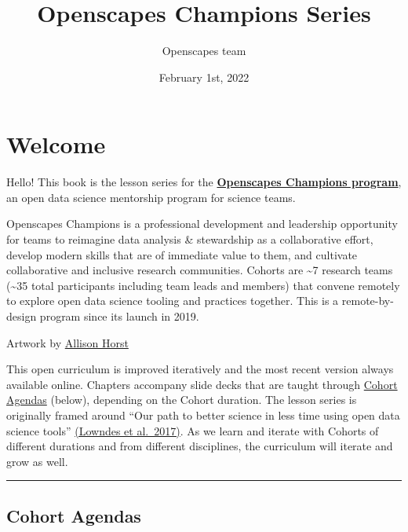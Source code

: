 \documentclass[
  letterpaper,
  DIV=11,
  numbers=noendperiod]{scrreprt}
\title{Openscapes Champions Series}
\author{Openscapes team}
\date{February 1st, 2022}
\renewcommand*\contentsname{Table of contents}
\begin{document}
\maketitle

\renewcommand*\contentsname{Table of contents}
{
\hypersetup{linkcolor=}
\setcounter{tocdepth}{2}
\tableofcontents
}
\hypertarget{welcome}{%
\chapter*{Welcome}\label{welcome}}

Hello! This book is the lesson series for the
\href{https://www.openscapes.org/champions/}{\textbf{Openscapes
Champions program}}, an open data science mentorship program for science
teams.

Openscapes Champions is a professional development and leadership
opportunity for teams to reimagine data analysis \& stewardship as a
collaborative effort, develop modern skills that are of immediate value
to them, and cultivate collaborative and inclusive research communities.
Cohorts are \textasciitilde7 research teams (\textasciitilde35 total
participants including team leads and members) that convene remotely to
explore open data science tooling and practices together. This is a
remote-by-design program since its launch in 2019.

Artwork by \href{https://twitter.com/allison_horst}{Allison Horst}

This open curriculum is improved iteratively and the most recent version
always available online. Chapters accompany slide decks that are taught
through \protect\hyperlink{agendas}{Cohort Agendas} (below), depending
on the Cohort duration. The lesson series is originally framed around
``Our path to better science in less time using open data science
tools'' \href{https://www.nature.com/articles/s41559-017-0160}{(Lowndes
et al.~2017)}. As we learn and iterate with Cohorts of different
durations and from different disciplines, the curriculum will iterate
and grow as well.

\begin{center}\rule{0.5\linewidth}{0.5pt}\end{center}

\hypertarget{cohort-agendas}{%
\section*{Cohort Agendas}\label{cohort-agendas}}
\end{document}
